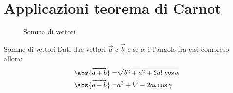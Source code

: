 \section{Applicazioni teorema di Carnot}
\begin{figure}
	\centering
	
	\caption{Somma di vettori}
	\label{fig:parasommavettori}
\end{figure}
\begin{teoremat}{Somme di vettori}{}
	Dati due vettori $\vec{a}$ e $\vec{b}$ e se $\alpha$ è l'angolo fra essi compreso allora:
	\begin{align*}
	\abs{\overrightarrow{a+b}}=&\sqrt{b^2+a^2+2ab\cos\alpha}\\
	\abs{\overrightarrow{a-b}}=&a^2+b^2-2ab\cos\gamma
	\end{align*}
\end{teoremat}